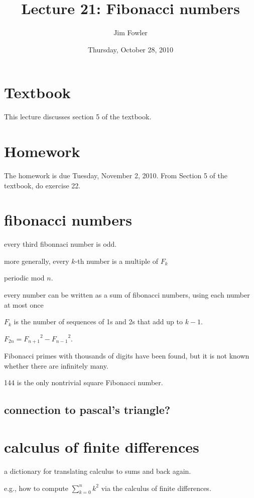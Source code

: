 \documentclass[12pt]{handout}
\title{Lecture 21: Fibonacci numbers}
\author{Jim Fowler}
\date{Thursday, October 28, 2010}
\begin{document}
\maketitle

\section*{Textbook}

This lecture discusses section 5 of the textbook.

\section*{Homework} 

The homework is due Tuesday, November  2, 2010.
From Section 5 of the textbook, do exercise 22.

\section*{fibonacci numbers}

every third fibonnaci number is odd.

more generally, every $k$-th number is a multiple of $F_k$

periodic mod $n$.

every number can be written as a sum of fibonacci numbers, using each number at most once

$F_k$ is the number of sequences of 1s and 2s that add up to $k-1$.

$F_{2n} = {F_{n+1}}^2 - {F_{n-1}}^2$.

Fibonacci primes with thousands of digits have been found, but it is not known whether there are infinitely many.

144 is the only nontrivial square Fibonacci number.

\subsection*{connection to pascal's triangle?}

\section*{calculus of finite differences}

a dictionary for translating calculus to sums and back again.

e.g., 
how to compute $\sum_{k=0}^n k^2$ via the calculus of finite
differences.
\end{document}
